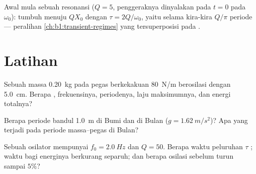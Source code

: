 \begin{omfigure}

{\small Awal mula sebuah resonansi ($Q = 5$, penggeraknya dinyalakan
pada $t = 0$ pada $\omega_0$):  tumbuh menuju $QX_0$ dengan
 $\tau = 2Q/\omega_0$, yaitu selama kira-kira $Q/\pi$
periode --- peralihan \cref{ch:b1:transient-regimes} yang tersuperposisi
pada .}
\end{omfigure}

\section{Latihan}

\begin{exercise}[$\star$]\label{exo:b1:oscillators-resonance:1}
Sebuah massa \qty{0.20}{kg} pada pegas berkekakuan \qty{80}{N/m}
berosilasi dengan  \qty{5.0}{cm}. Berapa ,
frekuensinya, periodenya, laju maksimumnya, dan energi totalnya?
\end{exercise}

\begin{exercise}[$\star$]\label{exo:b1:oscillators-resonance:2}
Berapa periode bandul \qty{1.0}{m} di Bumi dan di Bulan
($g = \qty{1.62}{m/s^2}$)? Apa yang terjadi pada periode massa--pegas di
Bulan?
\end{exercise}

\begin{exercise}[$\star$]\label{exo:b1:oscillators-resonance:3}
Sebuah osilator mempunyai $f_0 = \qty{2.0}{Hz}$ dan $Q = 50$. Berapa
waktu peluruhan $\tau$ ; waktu bagi energinya berkurang
separuh; dan berapa osilasi sebelum  turun sampai $5\%$?
\end{exercise}

